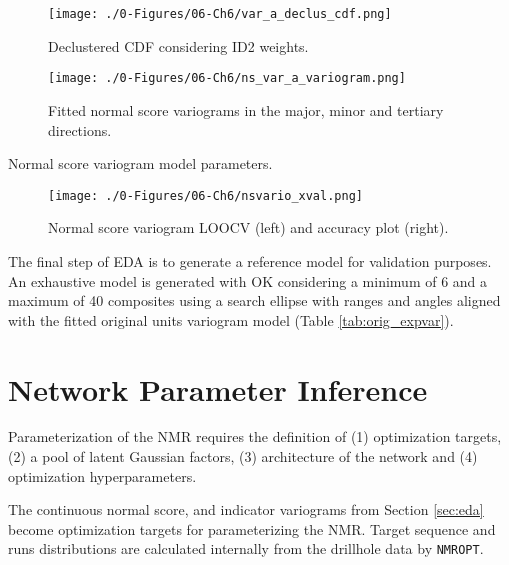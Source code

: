 \begin{figure}[htb!]
    \centering
    \texttt{[image: ./0-Figures/06-Ch6/var\_a\_declus\_cdf.png]}
    \caption{ Declustered \gls{CDF} considering \gls{ID2} weights. }
    \label{fig:declus_cdf}
\end{figure}

\begin{figure}[htb!]
    \centering
    \texttt{[image: ./0-Figures/06-Ch6/ns\_var\_a\_variogram.png]}
    \caption{Fitted normal score variograms in the major, minor and tertiary directions. }
    \label{fig:ns_expvar}
\end{figure}

\begin{table}[!htb]
    \centering
    \caption{Normal score variogram model parameters.}
    \resizebox{1\width}{!}{}
    \label{tab:ns_expvar}
\end{table}

\begin{figure}[htb!]
    \centering
    \texttt{[image: ./0-Figures/06-Ch6/nsvario\_xval.png]}
    \caption{Normal score variogram \gls{LOOCV} (left) and accuracy plot (right).}
    \label{fig:ns_xval}
\end{figure}

The final step of \gls{EDA} is to generate a reference model for validation purposes. An exhaustive model is generated with \gls{OK} considering a minimum of 6 and a maximum of 40 composites using a search ellipse with ranges and angles aligned with the fitted original units variogram model (Table \ref{tab:orig_expvar}).


\section{Network Parameter Inference}
\label{sec:param}

Parameterization of the \gls{NMR} requires the definition of (1) optimization targets, (2) a pool of latent Gaussian factors, (3) architecture of the network and (4) optimization hyperparameters.

The continuous normal score, and indicator variograms from Section \ref{sec:eda} become optimization targets for parameterizing the \gls{NMR}. Target sequence and runs distributions are calculated internally from the drillhole data by \texttt{NMROPT}.

